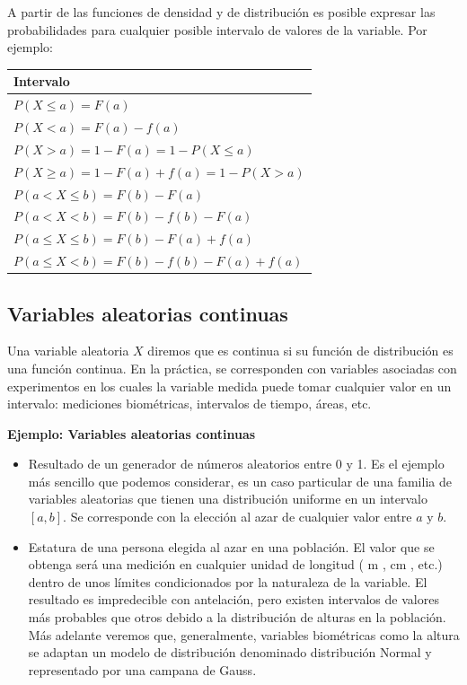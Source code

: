 \documentclass[
]{article}
\providecommand{\tightlist}{%
  \setlength{\itemsep}{0pt}\setlength{\parskip}{0pt}}
\begin{document}
A partir de las funciones de densidad y de distribución es posible
expresar las probabilidades para cualquier posible intervalo de valores
de la variable. Por ejemplo:

\begin{longtable}[]{@{}l@{}}
\toprule\noalign{}
Intervalo \\
\midrule\noalign{}
\endhead
\bottomrule\noalign{}
\endlastfoot
\(P(X \leq a)=F(a)\) \\
\(P(X<a)=F(a)-f(a)\) \\
\(P(X>a)=1-F(a)=1-P(X \leq a)\) \\
\(P(X \geq a)=1-F(a)+f(a)=1-P(X>a)\) \\
\(P(a<X \leq b)=F(b)-F(a)\) \\
\(P(a<X<b)=F(b)-f(b)-F(a)\) \\
\(P(a \leq X \leq b)=F(b)-F(a)+f(a)\) \\
\(P(a \leq X<b)=F(b)-f(b)-F(a)+f(a)\) \\
\end{longtable}

\subsection{Variables aleatorias continuas}\label{variables-aleatorias-continuas-1}

Una variable aleatoria \(X\) diremos que es continua si su función de
distribución es una función continua. En la práctica, se corresponden
con variables asociadas con experimentos en los cuales la variable
medida puede tomar cualquier valor en un intervalo: mediciones
biométricas, intervalos de tiempo, áreas, etc.

\textbf{Ejemplo: Variables aleatorias continuas}

\begin{itemize}
\tightlist
\item
  Resultado de un generador de números aleatorios entre 0 y 1. Es el
  ejemplo más sencillo que podemos considerar, es un caso particular
  de una familia de variables aleatorias que tienen una distribución
  uniforme en un intervalo \([a, b]\). Se corresponde con la elección al
  azar de cualquier valor entre \(a\) y \(b\).
\item
  Estatura de una persona elegida al azar en una población. El valor
  que se obtenga será una medición en cualquier unidad de longitud ( m
  , cm , etc.) dentro de unos límites condicionados por la naturaleza
  de la variable. El resultado es impredecible con antelación, pero
  existen intervalos de valores más probables que otros debido a la
  distribución de alturas en la población. Más adelante veremos que,
  generalmente, variables biométricas como la altura se adaptan un
  modelo de distribución denominado distribución Normal y representado
  por una campana de Gauss.
\end{itemize}
\end{document}
